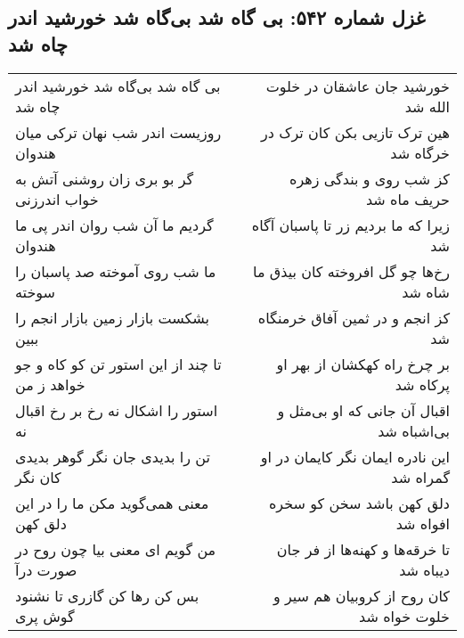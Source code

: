 \begin{center}
\section*{غزل شماره ۵۴۲: بی گاه شد بی‌گاه شد خورشید اندر چاه شد}
\label{sec:0542}
\begin{longtable}{l p{0.5cm} r}
بی گاه شد بی‌گاه شد خورشید اندر چاه شد
&&
خورشید جان عاشقان در خلوت الله شد
\\
روزیست اندر شب نهان ترکی میان هندوان
&&
هین ترک تازیی بکن کان ترک در خرگاه شد
\\
گر بو بری زان روشنی آتش به خواب اندرزنی
&&
کز شب روی و بندگی زهره حریف ماه شد
\\
گردیم ما آن شب روان اندر پی ما هندوان
&&
زیرا که ما بردیم زر تا پاسبان آگاه شد
\\
ما شب روی آموخته صد پاسبان را سوخته
&&
رخ‌ها چو گل افروخته کان بیذق ما شاه شد
\\
بشکست بازار زمین بازار انجم را ببین
&&
کز انجم و در ثمین آفاق خرمنگاه شد
\\
تا چند از این استور تن کو کاه و جو خواهد ز من
&&
بر چرخ راه کهکشان از بهر او پرکاه شد
\\
استور را اشکال نه رخ بر رخ اقبال نه
&&
اقبال آن جانی که او بی‌مثل و بی‌اشباه شد
\\
تن را بدیدی جان نگر گوهر بدیدی کان نگر
&&
این نادره ایمان نگر کایمان در او گمراه شد
\\
معنی همی‌گوید مکن ما را در این دلق کهن
&&
دلق کهن باشد سخن کو سخره افواه شد
\\
من گویم ای معنی بیا چون روح در صورت درآ
&&
تا خرقه‌ها و کهنه‌ها از فر جان دیباه شد
\\
بس کن رها کن گازری تا نشنود گوش پری
&&
کان روح از کروبیان هم سیر و خلوت خواه شد
\\
\end{longtable}
\end{center}
